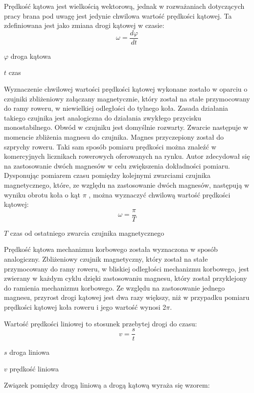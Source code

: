 Prędkość kątowa jest wielkością wektorową, jednak w rozważaniach dotyczących pracy brana pod uwagę jest jedynie chwilowa wartość prędkości kątowej. Ta zdefiniowana jest jako zmiana drogi kątowej w czasie:
\begin{equation}
    \omega = \frac{d\varphi}{dt}
    \label{eq:predkoscKatowa}
\end{equation}
\begin{eqwhere}[2cm]
	\item[$\varphi$] droga kątowa
	\item[$t$] czas
\end{eqwhere}
Wyznaczenie chwilowej wartości prędkości kątowej wykonane zostało w oparciu o czujniki zbliżeniowy załączany magnetycznie, który został na stałe przymocowany do ramy roweru, w niewielkiej odległości do tylnego koła. Zasada działania takiego czujnika jest analogiczna do działania zwykłego przycisku monostabilnego. Obwód w czujniku jest domyślnie rozwarty. Zwarcie następuje w momencie zbliżenia magnesu do czujnika. Magnes przyczepiony został do szprychy roweru. Taki sam sposób pomiaru prędkości można znaleźć w komercyjnych licznikach rowerowych oferowanych na rynku. Autor zdecydował się na zastosowanie dwóch magnesów w celu zwiększenia dokładności pomiaru. Dysponując pomiarem czasu pomiędzy kolejnymi zwarciami czujnika magnetycznego, które, ze względu na zastosowanie dwóch magnesów, następują w wyniku obrotu koła o kąt $\pi$ , można wyznaczyć chwilową wartość prędkości kątowej: 
\begin{equation}
    \omega = \frac{\pi}{T}
\end{equation}
\begin{eqwhere}[2cm]
	\item[$T$] czas od ostatniego zwarcia czujnika magnetycznego
\end{eqwhere}
Prędkość kątowa mechanizmu korbowego została wyznaczona w sposób analogiczny. Zbliżeniowy czujnik magnetyczny, który został na stałe przymocowany do ramy roweru, w bliskiej odległości mechanizmu korbowego, jest zwierany w każdym cyklu dzięki zastosowaniu magnesu, który został przyklejony do ramienia mechanizmu korbowego. Ze względu na zastosowanie jednego magnesu, przyrost drogi kątowej jest dwa razy większy, niż w przypadku pomiaru prędkości kątowej koła roweru i jego wartość wynosi 2$\pi$.

Wartość prędkości liniowej to stosunek przebytej drogi do czasu:
\begin{equation}
    v = \frac{s}{t}
\end{equation}
\begin{eqwhere}[2cm]
	\item[$s$] droga liniowa
	\item[$v$] prędkość liniowa
\end{eqwhere}
 Związek pomiędzy drogą liniową a drogą kątową wyraża się wzorem:

